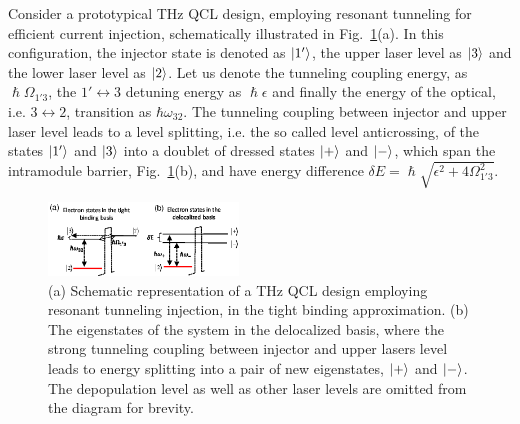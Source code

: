 \documentclass[journal]{IEEEtran}
\begin{document}
	Consider a prototypical THz QCL design, employing resonant tunneling for efficient current injection, schematically illustrated in Fig.~\ref{fig:basis}(a). In this configuration, the injector state is denoted as $\ket{1'}$, the upper laser level as $\ket{3}$ and the lower laser level as $\ket{2}$. Let us denote the tunneling coupling energy, as $\hslash\Omega_{1'3}$, the $1'\leftrightarrow 3$ detuning energy as $\hslash\epsilon$ and finally the energy of the optical, i.e. $3\leftrightarrow 2$, transition as $\hbar \omega_{32}$. The tunneling coupling between injector and upper laser level leads to a level splitting, i.e. the so called level anticrossing, of the states $\ket{1'}$ and $\ket{3}$ into a doublet of dressed states $\ket{+}$ and $\ket{-}$, which span the intramodule barrier, Fig.~\ref{fig:basis}(b), and have energy difference $\delta E = \hslash\sqrt{\epsilon^2 + 4\Omega_{1'3}^2}$.  
	
	\begin{figure}[h!]
		\begin{center}
			\includegraphics[width=0.45\textwidth]{IMGS/basis_compare2.eps}
			\caption{ (a) Schematic representation of a THz QCL design employing resonant tunneling injection, in the tight binding approximation. (b)  The eigenstates of the system in the delocalized basis, where the strong tunneling coupling between injector and upper lasers level leads to energy splitting into a pair of new eigenstates, $\ket{+}$ and $\ket{-}$.  The depopulation level as well as other laser levels are omitted from the diagram for brevity.} \label{fig:basis}
		\end{center}	
	\end{figure}
	
\end{document}
